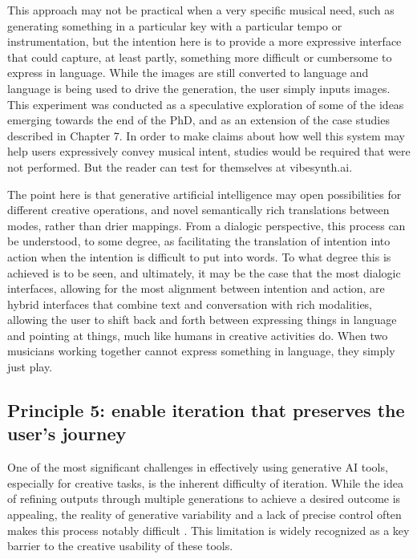 This approach may not be practical when a very specific musical need, such as generating something in a particular key with a particular tempo or instrumentation, but the intention here is to provide a more expressive interface that could capture, at least partly, something more difficult or cumbersome to express in language. While the images are still converted to language and language is being used to drive the generation, the user simply inputs images. This experiment was conducted as a speculative exploration of some of the ideas emerging towards the end of the PhD, and as an extension of the case studies described in Chapter 7. In order to make claims about how well this system may help users expressively convey musical intent, studies would be required that were not performed. But the reader can test for themselves at vibesynth.ai.

The point here is that generative artificial intelligence may open possibilities for different creative operations, and novel semantically rich translations between modes, rather than drier mappings. From a dialogic perspective, this process can be understood, to some degree, as facilitating the translation of intention into action when the intention is difficult to put into words. To what degree this is achieved is to be seen, and ultimately, it may be the case that the most dialogic interfaces, allowing for the most alignment between intention and action, are hybrid interfaces that combine text and conversation with rich modalities, allowing the user to shift back and forth between expressing things in language and pointing at things, much like humans in creative activities do. When two musicians working together cannot express something in language, they simply just play.

\subsection{Principle 5: enable iteration that preserves the user's journey}

One of the most significant challenges in effectively using generative AI tools, especially for creative tasks, is the inherent difficulty of iteration. While the idea of refining outputs through multiple generations to achieve a desired outcome is appealing, the reality of generative variability and a lack of precise control often makes this process notably difficult \cite{Park2024-gw}. This limitation is widely recognized as a key barrier to the creative usability of these tools.

